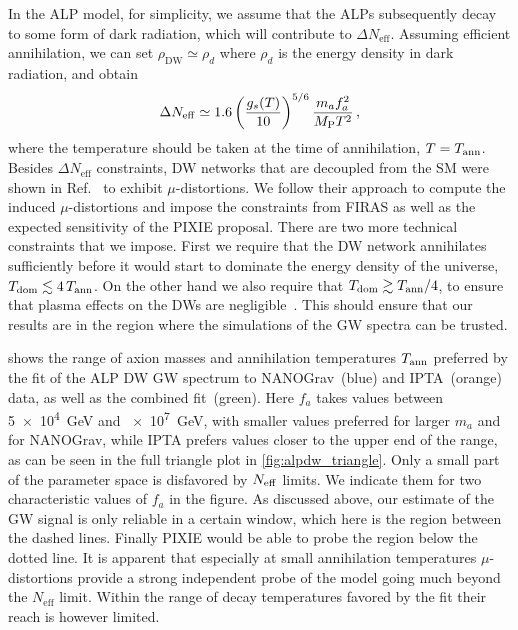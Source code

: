 \documentclass{article}
\newcommand*{\Neff}{\ensuremath{N_\mathrm{eff}}\xspace}
\newcommand*{\gs}{\ensuremath{g_{s}}\xspace}
\begin{document}
\bigskip 

In the ALP model, for simplicity, we assume that the ALPs subsequently decay to some form of dark radiation, which will contribute to $\Delta \Neff$. Assuming efficient annihilation, we can set $\rho_\text{DW}\simeq \rho_{d}$ where $\rho_{d}$ is the energy density in dark radiation, and obtain
  \begin{equation}
    \Delta \Neff \simeq 1.6\left(\frac{\gs(T)}{10}\right)^{5/6} \frac{m_{a}f_{a}^{2}}{M_{\rm P} T^2}\,,
\end{equation}
where the temperature should be taken at the time of annihilation, $T = T_{\rm ann}$.
Besides $\Delta\Neff$ constraints, DW networks that are decoupled from the SM were shown in Ref.~\cite{Ramberg:2022irf} to exhibit $\mu$-distortions. We follow their approach to compute the induced $\mu$-distortions and impose the constraints from FIRAS as well as the expected sensitivity of the PIXIE proposal. 
There are two more technical constraints that we impose. First we require that the DW network annihilates sufficiently before it would start to dominate the energy density of the universe, $T_{\rm dom}\lesssim 4\, T_{\rm ann}$. On the other hand we also require that $T_{\rm dom} \gtrsim T_{\rm ann}/4$, to ensure that plasma effects on the DWs are negligible~\cite{Blasi:2022ayo}. This should ensure that our results are in the region where the simulations of the GW spectra can be trusted. 

 shows the range of axion masses and annihilation temperatures $T_{\rm ann}$ preferred by the fit of the ALP DW GW spectrum to NANOGrav~(blue) and IPTA~(orange) data, as well as the combined fit~(green). Here $f_a$ takes values between \SI{5e4}{GeV} and \SI{e7}{GeV}, with smaller values preferred for larger $m_a$ and for NANOGrav, while IPTA prefers values closer to the upper end of the range, as can be seen in the full triangle plot in \cref{fig:alpdw_triangle}. Only a small part of the parameter space is disfavored by $N_{\rm eff}$ limits.
We indicate them for two characteristic values of $f_a$ in the figure. As discussed above, our estimate of the GW signal is only reliable in a certain window, which here is the region between the dashed lines. Finally PIXIE would be able to probe the region below the dotted line. It is apparent that especially at small annihilation temperatures $\mu$-distortions provide a strong independent probe of the model going much beyond the \Neff limit. Within the range of decay temperatures favored by the fit their reach is however limited.
\end{document}
